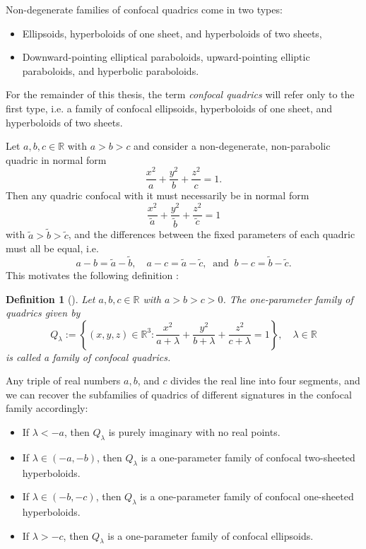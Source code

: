 \documentclass[10pt, a4paper]{article}
\theoremstyle{BoldTopSpacing}
\theoremstyle{BoldTopSpacing}
\theoremstyle{BoldTopSpacing}
\theoremstyle{BoldTopBottomSpacing}
\newtheorem{definition}{Definition}[section]
\theoremstyle{BoldTopSpacing}
\theoremstyle{BoldTopBottomSpacing}
\theoremstyle{remark}
\begin{document}
Non-degenerate families of confocal quadrics come in two types:
\begin{itemize}[label=$\blacktriangleright$]
    \item Ellipsoids, hyperboloids of one sheet, and hyperboloids of two sheets,
    \item Downward-pointing elliptical paraboloids, upward-pointing elliptic paraboloids, and hyperbolic paraboloids.
\end{itemize}
For the remainder of this thesis, the term \textit{confocal quadrics} will refer only to the first type, i.e. a family of confocal ellipsoids, hyperboloids of one sheet, and hyperboloids of two sheets. \par

Let $a, b, c \in \mathbb{R}$ with $a > b > c$ and consider a non-degenerate, non-parabolic quadric in normal form
\[
    \frac{x^2}{a} + \frac{y^2}{b} + \frac{z^2}{c} = 1.
\]
Then any quadric confocal with it must necessarily be in normal form
\[
    \frac{x^2}{\tilde{a}} + \frac{y^2}{\tilde{b}} + \frac{z^2}{\tilde{c}} = 1
\]
with $\tilde{a} > \tilde{b} > \tilde{c}$, and the differences between the fixed parameters of each quadric must all be equal, i.e.
\[
    a - b = \tilde{a} - \tilde{b}, \quad a - c = \tilde{a} - \tilde{c}, \ \text{ and } \  b - c = \tilde{b} - \tilde{c}.
\]
This motivates the following definition \cite{geometryIII}:

\begin{definition}[]
\label{def:family-of-confocal-quadrics}
Let $a, b, c \in \mathbb{R}$ with $a > b > c > 0$. The one-parameter family of quadrics given by
\[
    Q_{\lambda} := \left\{ (x, y, z) \in \mathbb{R}^3 : \frac{x^2}{a + \lambda} + \frac{y^2}{b + \lambda} + \frac{z^2}{c + \lambda} = 1 \right\}, \quad \lambda \in \mathbb{R}
\]
is called a family of \textit{confocal quadrics}.
\end{definition}

Any triple of real numbers $a, b$, and $c$ divides the real line into four segments, and we can recover the subfamilies of quadrics of different signatures in the confocal family accordingly:

\begin{itemize}[label=$\blacktriangleright$]
    \item If $\lambda < -a$, then $Q_{\lambda}$ is purely imaginary with no real points.
    \item If $\lambda \in (-a, -b)$, then $Q_{\lambda}$ is a one-parameter family of confocal two-sheeted hyperboloids.
    \item If $\lambda \in (-b, -c)$, then $Q_{\lambda}$ is a one-parameter family of confocal one-sheeted hyperboloids.
    \item If $\lambda > -c$, then $Q_{\lambda}$ is a one-parameter family of confocal ellipsoids. \par
\end{itemize}
\end{document}
